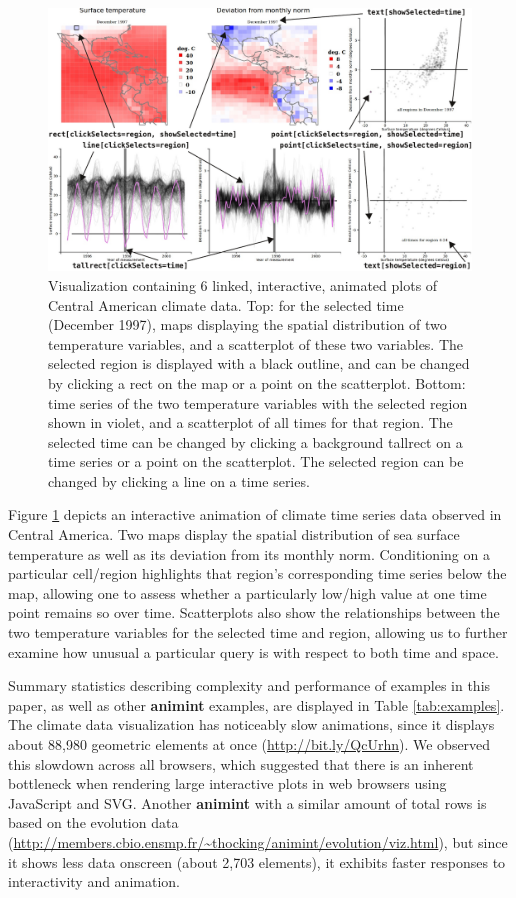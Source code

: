 \documentclass[12pt,]{article}
\theoremstyle{definition}
\theoremstyle{definition}
\theoremstyle{definition}
\theoremstyle{remark}
\begin{document}
\begin{figure}
\centering
\includegraphics{images/figure-climate}
\caption{\label{fig:climate}Visualization containing 6 linked, interactive,
animated plots of Central American climate data. Top: for the selected
time (December 1997), maps displaying the spatial distribution of two
temperature variables, and a scatterplot of these two variables. The
selected region is displayed with a black outline, and can be changed by
clicking a rect on the map or a point on the scatterplot. Bottom: time
series of the two temperature variables with the selected region shown
in violet, and a scatterplot of all times for that region. The selected
time can be changed by clicking a background tallrect on a time series
or a point on the scatterplot. The selected region can be changed by
clicking a line on a time series.}
\end{figure}

Figure \ref{fig:climate} depicts an interactive animation of climate
time series data observed in Central America. Two maps display the
spatial distribution of sea surface temperature as well as its deviation
from its monthly norm. Conditioning on a particular cell/region
highlights that region's corresponding time series below the map,
allowing one to assess whether a particularly low/high value at one time
point remains so over time. Scatterplots also show the relationships
between the two temperature variables for the selected time and region,
allowing us to further examine how unusual a particular query is with
respect to both time and space.

Summary statistics describing complexity and performance of examples in
this paper, as well as other \textbf{animint} examples, are displayed in
Table \ref{tab:examples}. The climate data visualization has noticeably
slow animations, since it displays about 88,980 geometric elements at
once (\url{http://bit.ly/QcUrhn}). We observed this slowdown across all
browsers, which suggested that there is an inherent bottleneck when
rendering large interactive plots in web browsers using JavaScript and
SVG. Another \textbf{animint} with a similar amount of total rows is
based on the evolution data
(\url{http://members.cbio.ensmp.fr/~thocking/animint/evolution/viz.html}),
but since it shows less data onscreen (about 2,703 elements), it
exhibits faster responses to interactivity and animation.
\end{document}
